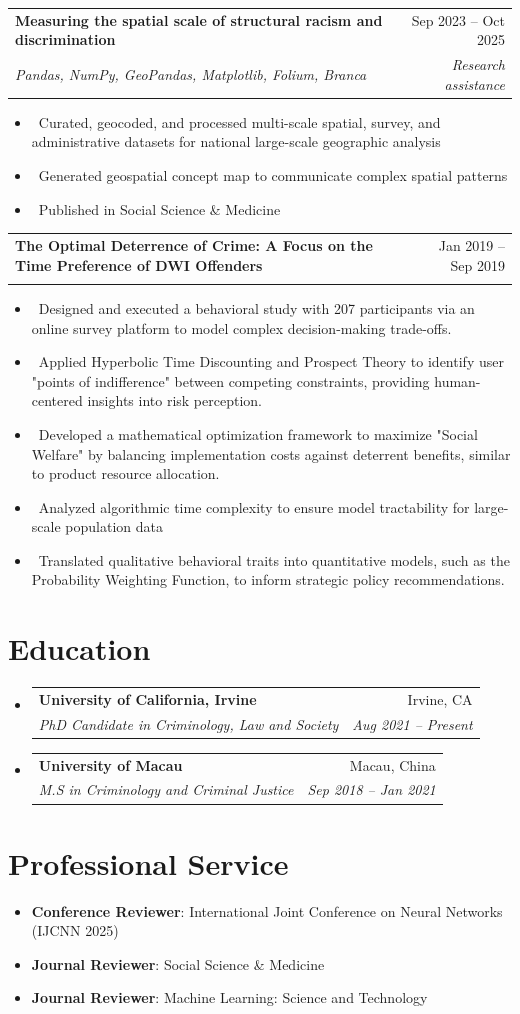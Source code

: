 \documentclass[letterpaper,10pt]{article}
\makeatletter
\newcommand{\resumeItem}[1]{\item\small{#1}}
\newcommand{\resumeSubheading}[4]{
\vspace{-1pt}\item
  \begin{tabular*}{0.97\textwidth}[t]{l@{\extracolsep{\fill}}r}
    \textbf{#1} & #2 \\
    \textit{#3} & \textit{#4} \\
  \end{tabular*}\vspace{-7pt}
}
\newcommand{\resumeSubHeadingList}{\begin{itemize}[leftmargin=0.15in, label={}]}
\newcommand{\resumeSubHeadingListEnd}{\end{itemize}}
\makeatother
\begin{document}
\resumeSubheading{Measuring the spatial scale of structural racism and discrimination}{Sep 2023 -- Oct 2025}{Pandas, NumPy, GeoPandas, Matplotlib, Folium, Branca}{Research assistance}
\resumeSubHeadingList
\resumeItem{\textbullet\ Curated, geocoded, and processed multi-scale spatial, survey, and administrative datasets for national large-scale geographic analysis}
\resumeItem{\textbullet\ Generated geospatial concept map to communicate complex spatial patterns}
\resumeItem{\textbullet\ Published in Social Science \& Medicine}
\resumeSubHeadingListEnd

\resumeSubheading{The Optimal Deterrence of Crime: A Focus on the Time Preference of DWI Offenders}{Jan 2019 -- Sep 2019}{}{}
\resumeSubHeadingList
\resumeItem{\textbullet\ Designed and executed a behavioral study with 207 participants via an online survey platform to model complex decision-making trade-offs.}
\resumeItem{\textbullet\ Applied Hyperbolic Time Discounting and Prospect Theory to identify user "points of indifference" between competing constraints, providing human-centered insights into risk perception.}
\resumeItem{\textbullet\ Developed a mathematical optimization framework to maximize "Social Welfare" by balancing implementation costs against deterrent benefits, similar to product resource allocation.}
\resumeItem{\textbullet\ Analyzed algorithmic time complexity to ensure model tractability for large-scale population data}
\resumeItem{\textbullet\ Translated qualitative behavioral traits into quantitative models, such as the Probability Weighting Function, to inform strategic policy recommendations.}
\resumeSubHeadingListEnd

\section{Education}
\resumeSubHeadingList
  \resumeSubheading
      {University of California, Irvine}{Irvine, CA}
      {PhD Candidate in Criminology, Law and Society}{Aug 2021 -- Present}
  \resumeSubheading
      {University of Macau}{Macau, China}
      {M.S in Criminology and Criminal Justice}{Sep 2018 -- Jan 2021}
\resumeSubHeadingListEnd

\section{Professional Service}
\resumeSubHeadingList
  \resumeItem{\textbf{Conference Reviewer}: International Joint Conference on Neural Networks (IJCNN 2025)}
  \resumeItem{\textbf{Journal Reviewer}: Social Science \& Medicine}
  \resumeItem{\textbf{Journal Reviewer}: Machine Learning: Science and Technology}
\resumeSubHeadingListEnd
\end{document}
